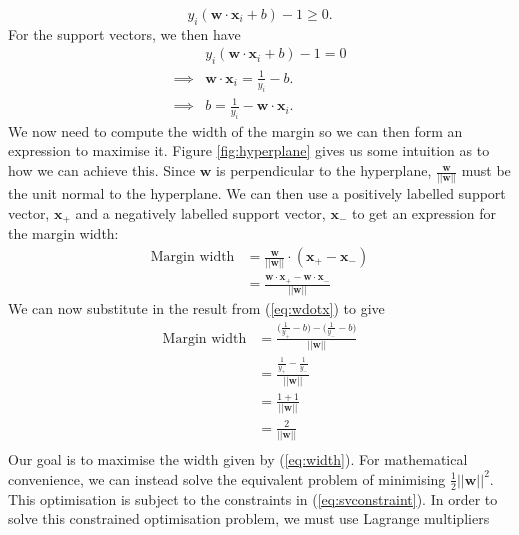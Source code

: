 \documentclass[12pt,a4paper,twoside,openright]{report}
\begin{document}
\begin{equation}
	y_i(\mathbf{w} \cdot \mathbf{x}_i + b) - 1 \ge 0.
\end{equation}
For the support vectors, we then have
\begin{align}
	& y_i(\mathbf{w} \cdot \mathbf{x}_i + b) - 1 = 0 \label{eq:svconstraint}\\
	\implies & \mathbf{w} \cdot \mathbf{x}_i = \frac{1}{y_i} - b. \label{eq:wdotx} \\
	\implies & b = \frac{1}{y_i} - \mathbf{w} \cdot \mathbf{x}_i. \label{eq:b}
\end{align}
\newline
\newline
We now need to compute the width of the margin so we can then form an expression to maximise it. Figure \ref{fig:hyperplane} gives us some intuition as to how we can achieve this. Since $\mathbf{w}$ is perpendicular to the hyperplane, $\frac{\mathbf{w}}{||\mathbf{w}||}$ must be the unit normal to the hyperplane. We can then use a positively labelled support vector, $\mathbf{x}_+$ and a negatively labelled support vector, $\mathbf{x}_-$ to get an expression for the margin width:
\begin{equation}
\begin{aligned}
	\text{Margin width} & = \frac{\mathbf{w}}{||\mathbf{w}||} \cdot (\mathbf{x}_+ - \mathbf{x}_-) \\
	& = \frac{\mathbf{w} \cdot \mathbf{x}_+ - \mathbf{w} \cdot \mathbf{x}_-}{||\mathbf{w}||}
\end{aligned}
\end{equation}
We can now substitute in the result from (\ref{eq:wdotx}) to give
\begin{equation} \label{eq:width}
\begin{aligned}
\text{Margin width} & = \frac{\big(\frac{1}{y_+} - b\big) - \big(\frac{1}{y_-} - b\big)}{||\mathbf{w}||} \\
& = \frac{\frac{1}{y_+} - \frac{1}{y_-}}{||\mathbf{w}||} \\
& = \frac{1 + 1}{||\mathbf{w}||} \\
& = \frac{2}{||\mathbf{w}||} \\
\end{aligned}
\end{equation}
Our goal is to maximise the width given by (\ref{eq:width}). For mathematical convenience, we can instead solve the equivalent problem of minimising $\frac{1}{2}||\mathbf{w}||^2$. This optimisation is subject to the constraints in (\ref{eq:svconstraint}). In order to solve this constrained optimisation problem, we must use Lagrange multipliers
\end{document}
